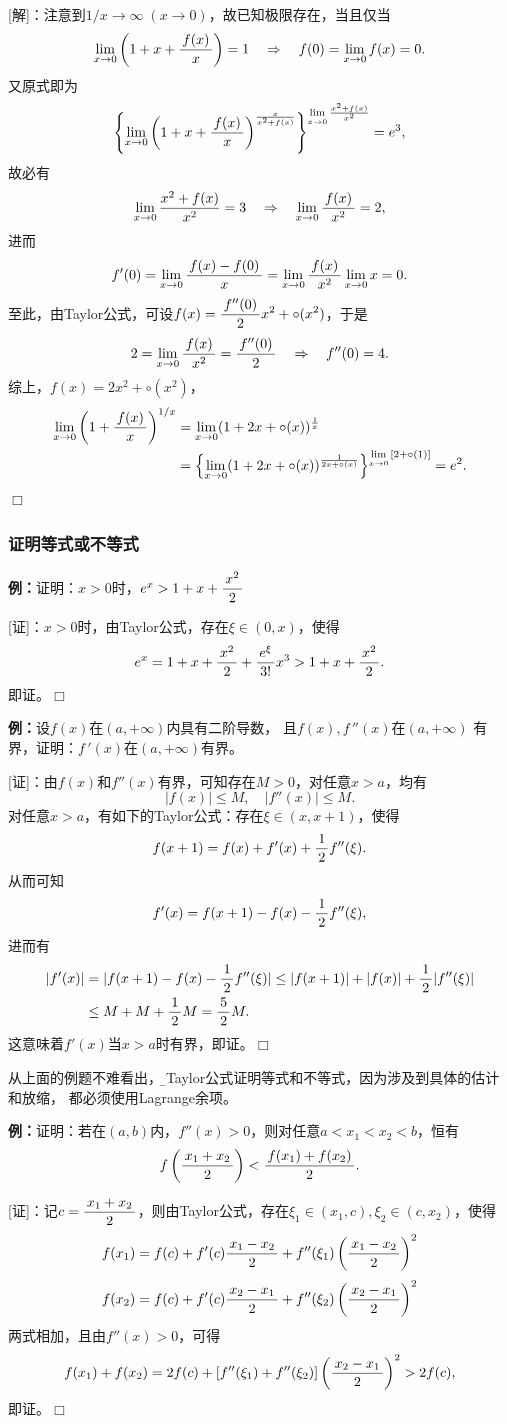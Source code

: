 [解]：注意到$1/x\to\infty\;(x\to0)$，故已知极限存在，当且仅当
$$\limx0\left(1+x+\df{f(x)}x\right)=1
\quad\Rightarrow\quad f(0)=\limx0f(x)=0.$$
又原式即为
$$\left\{\limx0\left(1+x+\df{f(x)}{x}\right)
^{\frac{x}{x^2+f(x)}}\right\}^{\limx0\frac{x^2+f(x)}{x^2}}=e^3,$$
故必有
$$\limx0\frac{x^2+f(x)}{x^2}=3\quad\Rightarrow\quad
\limx0\df{f(x)}{x^2}=2,$$
进而
$$f'(0)=\limx0\df{f(x)-f(0)}x=\limx0\df{f(x)}{x^2}\limx0x=0.$$
至此，由Taylor公式，可设$f(x)=\df{f''(0)}2x^2+\circ(x^2)$，于是
$$2=\limx0\df{f(x)}{x^2}=\df{f''(0)}2\quad\Rightarrow\quad
f''(0)=4.$$
综上，$f(x)=2x^2+\circ(x^2)$，
\begin{align}
	\limx{0}\left(1+\df{f(x)}{x}\right)^{1/x}
	&=\limx0(1+2x+\circ(x))^{\frac1x}\notag\\
	&=\left\{\limx0(1+2x+\circ(x))^{\frac1{2x+\circ(x)}}\right\}
	^{\limx0{[2+\circ(1)]}}=e^2.\notag	
\end{align}
\hfill$\Box$

\subsubsection{证明等式或不等式}

{\bf 例：}证明：$x>0$时，$e^x>1+x+\df{x^2}{2}$

[证]：$x>0$时，由Taylor公式，存在$\xi\in(0,x)$，使得
$$e^x=1+x+\df{x^2}2+\df{e^{\xi}}{3!}x^3>1+x+\df{x^2}2.$$
即证。\hfill$\Box$

{\bf 例：}设$f(x)$在$(a,+\infty)$内具有二阶导数，
且$f(x),f\,''(x)$在$(a,+\infty)$
有界，证明：$f\,'(x)$在$(a,+\infty)$有界。

[证]：由$f(x)$和$f''(x)$有界，可知存在$M>0$，对任意$x>a$，均有
$$|f(x)|\leq M,\quad |f''(x)|\leq M.$$
对任意$x>a$，有如下的Taylor公式：存在$\xi\in(x,x+1)$，使得
$$f(x+1)=f(x)+f'(x)+\df12f''(\xi).$$
从而可知
$$f'(x)=f(x+1)-f(x)-\df12f''(\xi),$$
进而有
\begin{align*}
	|f'(x)|&=|f(x+1)-f(x)-\df12f''(\xi)|
	\leq |f(x+1)|+|f(x)|+\df12|f''(\xi)|\\
	&\leq M+M+\df12M=\df52M.
\end{align*}
这意味着$f'(x)$当$x>a$时有界，即证。\hfill$\Box$

从上面的例题不难看出，{\b 用Taylor公式证明等式和不等式，因为涉及到具体的估计和放缩，
都必须使用Lagrange余项}。

{\bf 例：}证明：若在$(a,b)$内，$f''(x)>0$，则对任意$a<x_1<x_2<b$，恒有
$$f\left(\df{x_1+x_2}{2}\right)<\df{f(x_1)+f(x_2)}{2}.$$

[证]：记$c=\df{x_1+x_2}2$，则由Taylor公式，存在$\xi_1\in(x_1,c),
\xi_2\in(c,x_2)$，使得
$$f(x_1)=f(c)+f'(c)\df{x_1-x_2}2+f''(\xi_1)
\left(\df{x_1-x_2}2\right)^2$$
$$f(x_2)=f(c)+f'(c)\df{x_2-x_1}2+f''(\xi_2)
\left(\df{x_2-x_1}2\right)^2$$
两式相加，且由$f''(x)>0$，可得
$$f(x_1)+f(x_2)=2f(c)+[f''(\xi_1)+f''(\xi_2)]
\left(\df{x_2-x_1}2\right)^2>2f(c),$$
即证。\hfill$\Box$

